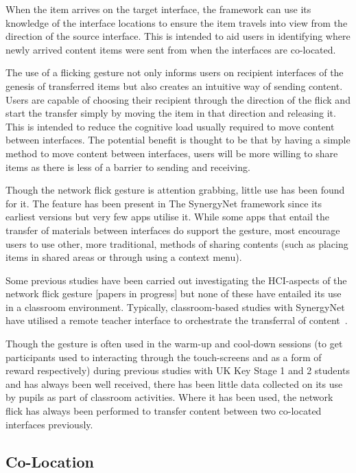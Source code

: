\documentclass[a4paper,11pt]{article}
\begin{document}
When the item arrives on the target interface, the framework can use its knowledge of the interface locations to ensure the item travels into view from the direction of the source interface.
This is intended to aid users in identifying where newly arrived content items were sent from when the interfaces are co-located.

The use of a flicking gesture not only informs users on recipient interfaces of the genesis of transferred items but also creates an intuitive way of sending content.
Users are capable of choosing their recipient through the direction of the flick and start the transfer simply by moving the item in that direction and releasing it.
This is intended to reduce the cognitive load usually required to move content between interfaces.
The potential benefit is thought to be that by having a simple method to move content between interfaces, users will be more willing to share items as there is less of a barrier to sending and receiving.

Though the network flick gesture is attention grabbing, little use has been found for it.
The feature has been present in The SynergyNet framework since its earliest versions but very few apps utilise it.
While some apps that entail the transfer of materials between interfaces do support the gesture, most encourage users to use other, more traditional, methods of sharing contents (such as placing items in shared areas or through using a context menu).

Some previous studies have been carried out investigating the HCI-aspects of the network flick gesture [papers in progress] but none of these have entailed its use in a classroom environment.
Typically, classroom-based studies with SynergyNet have utilised a remote teacher interface to orchestrate the transferral of content~\cite{joycegibbons:2016}.

Though the gesture is often used in the warm-up and cool-down sessions (to get participants used to interacting through the touch-screens and as a form of reward respectively) during previous studies with UK Key Stage 1 and 2 students and has always been well received, there has been little data collected on its use by pupils as part of classroom activities.
Where it has been used, the network flick has always been performed to transfer content between two co-located interfaces previously.

\subsection{Co-Location}
\end{document}
